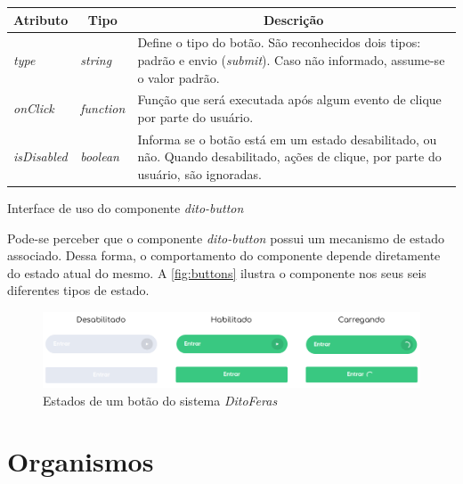 \begin{quadro}
\centering
\begin{tabular}{|m{4cm}|m{3cm}|m{7cm}|} \hline
	
	\multicolumn{1}{|c|}{\bfseries Atributo} & \multicolumn{1}{c|}{\bfseries Tipo} & \multicolumn{1}{c|}{\bfseries Descrição} \\\hline
	
	 \textit{type} & \textit{string} & Define o tipo do botão. São reconhecidos dois tipos: padrão e envio (\textit{submit}). Caso não informado, assume-se o valor padrão. \\\hline
	 \textit{onClick} & \textit{function} & Função que será executada após algum evento de clique por parte do usuário. \\\hline
	 \textit{isDisabled} & \textit{boolean} & Informa se o botão está em um estado desabilitado, ou não. Quando desabilitado, ações de clique, por parte do usuário, são ignoradas. \\\hline
    
\end{tabular}
\caption{Interface de uso do componente \textit{dito-button}}
\label{table:ditoButton}
\end{quadro}

Pode-se perceber que o componente \textit{dito-button} possui um mecanismo de estado associado. Dessa forma, o comportamento do componente depende diretamente do estado atual do mesmo. A \autoref{fig:buttons} ilustra o componente nos seus seis diferentes tipos de estado.

\begin{figure}
  \begin{center}
	  \includegraphics[width=\linewidth]{./04-figuras/06_biblioteca_componentes/buttons.png}
	\end{center}
  \caption{Estados de um botão do sistema \textit{DitoFeras}}
  \label{fig:buttons}
\end{figure}

\section{Organismos}

